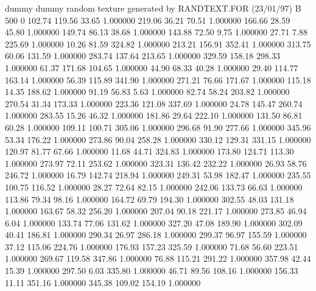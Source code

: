 dummy
dummy
random texture generated by RANDTEXT.FOR (23/01/97)
B   500   0
    102.74    119.56     33.65  1.000000
    219.06     36.21     70.51  1.000000
    166.66     28.59     45.80  1.000000
    149.74     86.13     38.68  1.000000
    143.88     72.50      9.75  1.000000
     27.71      7.88    225.69  1.000000
     10.26     81.59    324.82  1.000000
    213.21    156.91    352.41  1.000000
    313.75     60.06    131.59  1.000000
    283.74    137.64    213.65  1.000000
    329.59    158.18    298.33  1.000000
     61.37    171.68    104.65  1.000000
     44.90     68.33     40.28  1.000000
     29.40    114.77    163.14  1.000000
     56.39    115.89    341.90  1.000000
    271.21     76.66    171.67  1.000000
    115.18     14.35    188.62  1.000000
     91.19     56.83      5.63  1.000000
     82.74     58.24    203.82  1.000000
    270.54     31.34    173.33  1.000000
    223.36    121.08    337.69  1.000000
     24.78    145.47    260.74  1.000000
    283.55     15.26     46.32  1.000000
    181.86     29.64    222.10  1.000000
    131.50     86.81     60.28  1.000000
    109.11    100.71    305.06  1.000000
    296.68     91.90    277.66  1.000000
    345.96     53.34    176.22  1.000000
    273.86     90.04    258.28  1.000000
    330.12    129.31    331.15  1.000000
    120.97     81.77     67.66  1.000000
     11.68     44.71    324.83  1.000000
    173.80    124.71    113.30  1.000000
    273.97     72.11    253.62  1.000000
    323.31    136.42    232.22  1.000000
     26.93     58.76    246.72  1.000000
     16.79    142.74    218.94  1.000000
    249.31     53.98    182.47  1.000000
    235.55    100.75    116.52  1.000000
     28.27     72.64     82.15  1.000000
    242.06    133.73     66.63  1.000000
    113.86     79.34     98.16  1.000000
    164.72     69.79    194.30  1.000000
    302.55     48.03    131.18  1.000000
    163.67     58.32    256.20  1.000000
    207.04     90.18    221.17  1.000000
    273.85     46.94      6.04  1.000000
    133.74     77.06    131.62  1.000000
    327.20     47.08    189.90  1.000000
    302.09     40.41    186.81  1.000000
    290.34     26.97    286.18  1.000000
    299.37     96.97    155.59  1.000000
     37.12    115.06    224.76  1.000000
    176.93    157.23    325.59  1.000000
     71.68     56.60    223.51  1.000000
    269.67    119.58    347.86  1.000000
     76.88    115.21    291.22  1.000000
    357.98     42.44     15.39  1.000000
    297.50      6.03    335.80  1.000000
     46.71     89.56    108.16  1.000000
    156.33     11.11    351.16  1.000000
    345.38    109.02    154.19  1.000000
